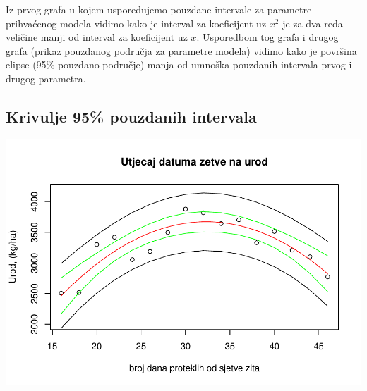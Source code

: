 \documentclass[]{article}
\newenvironment{Shaded}{\begin{snugshade}}{\end{snugshade}}
\newcommand{\KeywordTok}[1]{\textcolor[rgb]{0.13,0.29,0.53}{\textbf{{#1}}}}
\newcommand{\DataTypeTok}[1]{\textcolor[rgb]{0.13,0.29,0.53}{{#1}}}
\newcommand{\DecValTok}[1]{\textcolor[rgb]{0.00,0.00,0.81}{{#1}}}
\newcommand{\StringTok}[1]{\textcolor[rgb]{0.31,0.60,0.02}{{#1}}}
\newcommand{\OtherTok}[1]{\textcolor[rgb]{0.56,0.35,0.01}{{#1}}}
\newcommand{\NormalTok}[1]{{#1}}
\begin{document}
Iz prvog grafa u kojem uspoređujemo pouzdane intervale za parametre
prihvaćenog modela vidimo kako je interval za koeficijent uz \(x^2\) je
za dva reda veličine manji od interval za koeficijent uz \(x\).
Usporedbom tog grafa i drugog grafa (prikaz pouzdanog područja za
parametre modela) vidimo kako je površina elipse (95\% pouzdano
područje) manja od umnoška pouzdanih intervala prvog i drugog parametra.

\subsection{Krivulje 95\% pouzdanih
intervala}\label{krivulje-95-pouzdanih-intervala-1}

\begin{Shaded}
\end{Shaded}

\includegraphics{Izvjestaj_files/figure-latex/unnamed-chunk-24-1.pdf}
\end{document}
